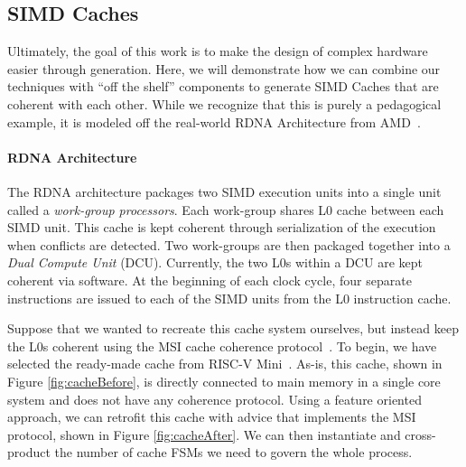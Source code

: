 \documentclass[sigplan,anonymous,review]{acmart}
\begin{document}
\subsection{SIMD Caches}\label{sec:cache}
Ultimately, the goal of this work is to make the design of complex hardware easier through generation. Here, we will demonstrate how we can combine our techniques with ``off the shelf'' components to generate SIMD Caches that are coherent with each other. While we recognize that this is purely a pedagogical example, it is modeled off the real-world RDNA Architecture from AMD~\cite{}.

\paragraph{RDNA Architecture} The RDNA architecture packages two SIMD execution units into a single unit called a \textit{work-group processors}. Each work-group shares L0 cache between each SIMD unit. This cache is kept coherent through serialization of the execution when conflicts are detected. Two work-groups are then packaged together into a \textit{Dual Compute Unit} (DCU). Currently, the two L0s within a DCU are kept coherent via software. At the beginning of each clock cycle, four separate instructions are issued to each of the SIMD units from the L0 instruction cache.

Suppose that we wanted to recreate this cache system ourselves, but instead keep the L0s coherent using the MSI cache coherence protocol~\cite{}. To begin, we have selected the ready-made cache from RISC-V Mini~\cite{}. As-is, this cache, shown in Figure \ref{fig:cacheBefore}, is directly connected to main memory in a single core system and does not have any coherence protocol. Using a feature oriented approach, we can retrofit this cache with advice that implements the MSI protocol, shown in Figure \ref{fig:cacheAfter}. We can then instantiate and cross-product the number of cache FSMs we need to govern the whole process. 
\end{document}
